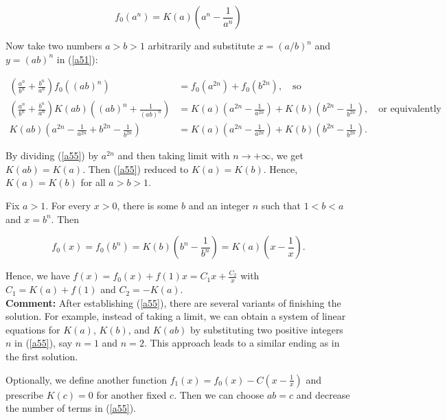 \documentclass[a4paper, 12pt]{article}
\begin{document}
\begin{enumerate}
$$
f_0(a^n) = K(a) \left( a^n - \frac{1}{a^n}  \right)
$$

Now take two numbers $a > b > 1$ arbitrarily and substitute $x = (a/b)^n$ and $y = (ab)^n$ in (\ref{a51}):

\begin{align}
    \left(\frac{a^n}{b^n} + \frac{b^n}{a^n} \right) f_0((ab)^n) &= f_0(a^{2n}) + f_0(b^{2n}), \quad \textrm{so} \nonumber \\
    \left(\frac{a^n}{b^n} + \frac{b^n}{a^n} \right) K(ab) \left((ab)^n + \frac{1}{(ab)^n} \right) &= K(a) \left(a^{2n} - \frac{1}{a^{2n}} \right) + K(b) \left(b^{2n} - \frac{1}{b^{2n}} \right), \quad \textrm{or equivalently} \nonumber \\
    K(ab) \left( a^{2n} - \frac{1}{a^{2n}} + b^{2n} - \frac{1}{b^{2n}}    \right) &= K(a) \left(a^{2n} - \frac{1}{a^{2n}} \right) + K(b) \left(b^{2n} - \frac{1}{b^{2n}} \right) \label{a55}.
\end{align}

By dividing (\ref{a55}) by $a^{2n}$ and then taking limit with $n \to + \infty$, we get $K(ab) = K(a)$. Then (\ref{a55}) reduced to $K(a) = K(b)$. Hence, $K(a) = K(b)$ for all $a > b > 1$.

Fix $a > 1$. For every $x > 0$, there is some $b$ and an integer $n$ such that $1 < b < a$ and $x = b^n$. Then

$$
f_0(x) = f_0(b^n) = K(b) \left(b^n - \frac{1}{b^n} \right) = K(a) \left(  x  - \frac{1}{x} \right).
$$

Hence, we have $f(x) = f_0(x) + f(1)x = C_1 x + \frac{C_2}{x}$ with $C_1 = K(a) + f(1)$ and $C_2 = -K(a)$. \\

\textbf{Comment:}  After establishing (\ref{a55}), there are several variants of finishing the solution.  For example, instead of taking a limit, we can obtain a system of linear equations for $K(a)$, $K(b)$, and $K(ab)$ by substituting two positive integers $n$ in (\ref{a55}), say $n = 1$ and $n = 2$. This approach leads to a similar ending as in the first solution.

Optionally, we define another function $f_1(x) = f_0(x) - C(x - \frac{1}{x})$ and prescribe $K(c) = 0$ for another fixed $c$. Then we can choose $ab = c$ and decrease the number of terms in (\ref{a55}).

\vspace{6mm}


    

\end{enumerate}
\end{document}
